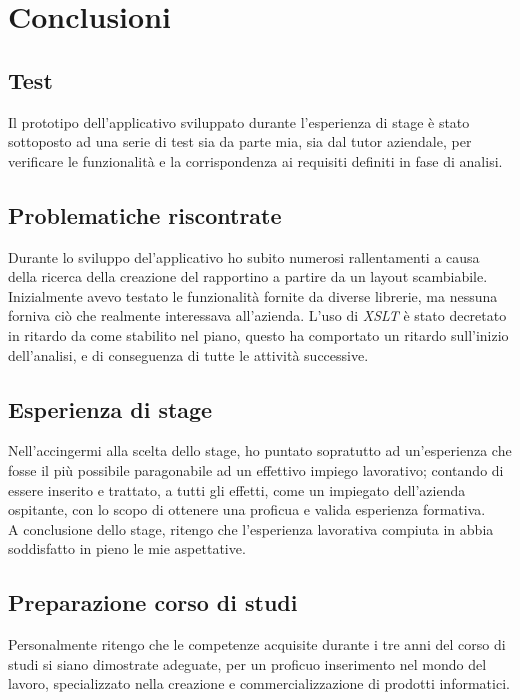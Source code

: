\newpage
\chapter{Conclusioni}
\label{cap:conclusioni}

\section{Test}
Il prototipo dell'applicativo sviluppato durante l'esperienza di stage è stato sottoposto ad una serie di test sia da parte mia, sia dal tutor aziendale, per verificare le funzionalità e la corrispondenza ai requisiti definiti in fase di analisi.
\section{Problematiche riscontrate}
Durante lo sviluppo del'applicativo ho subito numerosi rallentamenti a causa della ricerca della creazione del rapportino a partire da un layout scambiabile. Inizialmente avevo testato le funzionalità fornite da diverse librerie, ma nessuna forniva ciò che realmente interessava all'azienda. L'uso di \textit{XSLT} è stato decretato in ritardo da come stabilito nel piano, questo ha comportato un ritardo sull'inizio dell'analisi, e di conseguenza di tutte le attività successive.  
\section{Esperienza di stage}
Nell'accingermi alla scelta dello stage, ho puntato sopratutto ad un'esperienza che fosse il più possibile paragonabile ad un effettivo impiego lavorativo; contando di essere inserito e trattato, a tutti gli effetti, come un impiegato dell'azienda ospitante, con lo scopo di ottenere una proficua e valida esperienza formativa.
\\
A conclusione dello stage, ritengo che l'esperienza lavorativa compiuta in \asi abbia soddisfatto in pieno le mie aspettative.
\section{Preparazione corso di studi}
Personalmente ritengo che le competenze acquisite durante i tre anni del corso di studi si siano dimostrate adeguate, per un proficuo inserimento nel mondo del lavoro, specializzato nella creazione e commercializzazione di prodotti informatici.

